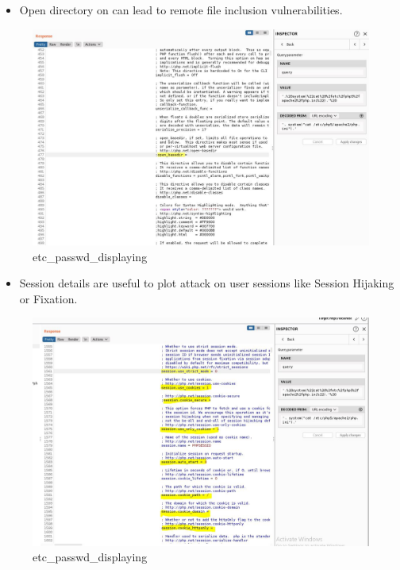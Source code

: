 \begin{itemize}
  \begin{itemize}
  \tightlist
  \item
    Open directory on can lead to remote file inclusion vulnerabilities.
  \end{itemize}

  \begin{figure}
  \centering
  \includegraphics{images/task2/PHPV2.JPG}
  \caption{etc\_passwd\_displaying}
  \end{figure}

  \begin{itemize}
  \tightlist
  \item
    Session details are useful to plot attack on user sessions like
    Session Hijaking or Fixation.
  \end{itemize}

  \begin{figure}
  \centering
  \includegraphics{images/task2/PHPV3.JPG}
  \caption{etc\_passwd\_displaying}
  \end{figure}
\end{itemize}

